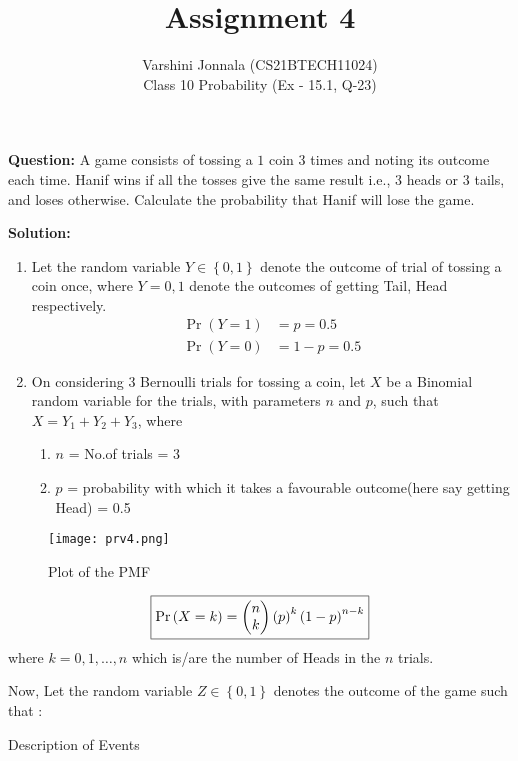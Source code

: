 \documentclass[journal,12pt,twocolumn]{IEEEtran}
\title{Assignment 4}
\author{Varshini Jonnala (CS21BTECH11024) \\ Class 10 Probability (Ex - 15.1, Q-23)}
\providecommand{\pr}[1]{\ensuremath{\Pr\left(#1\right)}}
\providecommand{\brak}[1]{\ensuremath{\left(#1\right)}}
\providecommand{\cbrak}[1]{\ensuremath{\left\{#1\right\}}}
\newcommand{\myvec}[1]{\ensuremath{\begin{pmatrix}#1\end{pmatrix}}}
\newcommand{\solution}{\noindent \textbf{Solution: }}
\begin{document}
    \maketitle
    
    \noindent \textbf{Question: } A game consists of tossing a \rupee$1$ coin $3$ times and noting its outcome each time. Hanif wins if all the tosses give the same result i.e., $3$ heads or $3$ tails, and loses otherwise. Calculate the probability that Hanif will lose the game.
    
    \solution
    
    \begin{enumerate}
         \item Let the random variable $Y\in \cbrak{0,1}$  denote the outcome of trial of tossing a coin once, where $Y = 0,1$ denote the outcomes of getting Tail, Head respectively.
	\begin{align}
		\pr{Y=1} &= p = 0.5\\
		\pr{Y=0} &= 1-p = 0.5
	\end{align}
        \item On considering $3$ Bernoulli trials for tossing a coin, let $X$ be a Binomial random variable for the trials, with parameters $n$ and $p$, such that $X = Y_1 + Y_2 + Y_3$, where
    \begin{enumerate}
		\item $n$ = No.of trials = 3
		\item $p$ = probability with which it takes a favourable outcome(here say getting Head) = 0.5
	\end{enumerate}
	\end{enumerate}
	\begin{figure}[!ht]
	\centering
    \texttt{[image: prv4.png]}
    \caption{Plot of the PMF}
    \label{fig:fig-1}
    \end{figure}
	\begin{align}
	   \fbox{$\pr{X = k} = \myvec{n\\k}\brak{p}^k\brak{1-p}^{n-k}$} \label{3}
	\end{align}
	where $k= 0,1,\dots, n$ which is/are the number of Heads in the $n$ trials.
    	
   Now, Let the random variable $Z \in \cbrak{0,1}$ denotes the outcome of the game such that : 
    \begin{table}[ht!]
        \centering
        
    	\caption{Description of Events}
    	\label{Tables:Table}
    \end{table}
    
\end{document}
